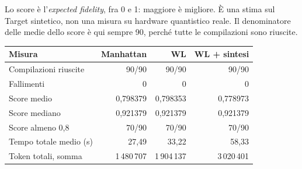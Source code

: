 \documentclass[a4paper,10pt]{article}
\begin{document}
Lo score è l'\emph{expected fidelity}, fra 0 e 1: maggiore è migliore.
È una stima sul Target sintetico, non una misura su hardware quantistico reale.
Il denominatore delle medie dello score è qui sempre 90, perché tutte le
compilazioni sono riuscite.
\par\medskip\begingroup\small\renewcommand{\arraystretch}{1.18}\setlength{\tabcolsep}{5pt}
\begin{tabularx}{\linewidth}{Xrrr}\toprule
Misura & Manhattan & WL & WL + sintesi\\\midrule
Compilazioni riuscite & 90/90 & 90/90 & 90/90\\
Fallimenti & 0 & 0 & 0\\
Score medio & 0,798379 & 0,798353 & 0,778973\\
Score mediano & 0,921379 & 0,921379 & 0,921379\\
Score almeno 0,8 & 70/90 & 70/90 & 70/90\\
Tempo totale medio (s) & 27,49 & 33,22 & 58,33\\
Token totali, somma & 1\,480\,707 & 1\,904\,137 & 3\,020\,401\\
\bottomrule\end{tabularx}\endgroup\par
\end{document}
